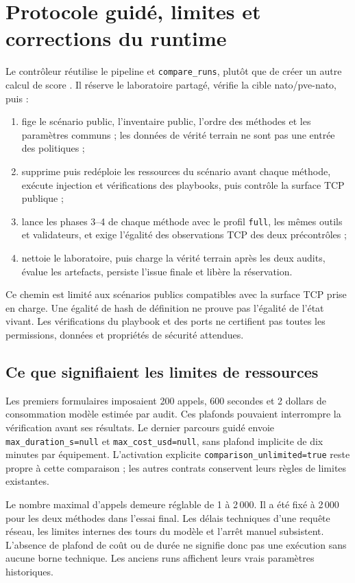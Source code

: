 \documentclass[11pt,a4paper]{article}
\newcommand{\code}[1]{\nolinkurl{#1}}
\begin{document}
\clearpage
\section{Protocole guidé, limites et corrections du runtime}
Le contrôleur réutilise le pipeline et \code{compare_runs}, plutôt que de
créer un autre calcul de score \cite{paire,comparateur}. Il réserve le
laboratoire partagé, vérifie la cible nato/pve-nato, puis :
\begin{enumerate}
\item fige le scénario public, l'inventaire public, l'ordre des méthodes et les
paramètres communs ; les données de vérité terrain ne sont pas une entrée des politiques ;
\item supprime puis redéploie les ressources du scénario avant chaque méthode,
exécute injection et vérifications des playbooks, puis contrôle la surface TCP publique ;
\item lance les phases 3--4 de chaque méthode avec le profil \code{full}, les
mêmes outils et validateurs, et exige l'égalité des observations TCP des deux précontrôles ;
\item nettoie le laboratoire, puis charge la vérité terrain après les deux
audits, évalue les artefacts, persiste l'issue finale et libère la réservation.
\end{enumerate}

Ce chemin est limité aux scénarios publics compatibles avec la surface TCP
prise en charge. Une égalité de hash de définition ne prouve pas l'égalité de
l'état vivant. Les vérifications du playbook et des ports ne certifient pas
toutes les permissions, données et propriétés de sécurité attendues.

\subsection{Ce que signifiaient les limites de ressources}
Les premiers formulaires imposaient 200 appels, 600 secondes et 2 dollars de
consommation modèle estimée par audit. Ces plafonds pouvaient interrompre la
vérification avant ses résultats. Le dernier parcours guidé envoie
\code{max_duration_s=null} et \code{max_cost_usd=null}, sans plafond implicite
de dix minutes par équipement. L'activation explicite
\code{comparison_unlimited=true} reste propre à cette comparaison ; les
autres contrats conservent leurs règles de limites existantes.

Le nombre maximal d'appels demeure réglable de 1 à 2\,000. Il a été fixé à
2\,000 pour les deux méthodes dans l'essai final. Les délais techniques d'une
requête réseau, les limites internes des tours du modèle et l'arrêt manuel
subsistent. L'absence de plafond de coût ou de durée ne signifie donc pas une
exécution sans aucune borne technique. Les anciens runs affichent leurs vrais
paramètres historiques.
\end{document}
